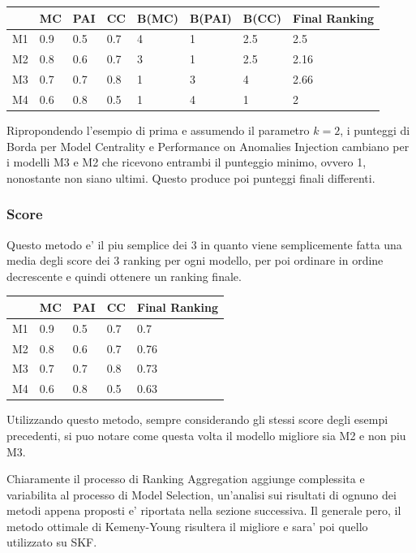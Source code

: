 \begin{tabular}{|l|l|l|l|l|l|l|l|}
\hline
   & MC  & PAI & CC  & B(MC) & B(PAI) & B(CC) & Final Ranking \\ \hline
M1 & 0.9 & 0.5 & 0.7 & 4     & 1      & 2.5   & 2.5           \\ \hline
M2 & 0.8 & 0.6 & 0.7 & 3     & 1      & 2.5   & 2.16          \\ \hline
M3 & 0.7 & 0.7 & 0.8 & 1     & 3      & 4     & 2.66          \\ \hline
M4 & 0.6 & 0.8 & 0.5 & 1     & 4      & 1     & 2             \\ \hline
\end{tabular}


Ripropondendo l'esempio di prima e assumendo il parametro \(k=2\), i punteggi di Borda per Model Centrality e Performance on Anomalies Injection cambiano per i modelli M3 e M2 che ricevono entrambi il punteggio minimo, ovvero 1, nonostante non siano ultimi. Questo produce poi punteggi finali differenti.
\subsubsection{Score}
Questo metodo e' il piu semplice dei 3 in quanto viene semplicemente fatta una media degli score dei 3 ranking per ogni modello, per poi ordinare in ordine decrescente e quindi ottenere un ranking finale.


\begin{tabular}{|l|l|l|l|l|}
\hline
   & MC  & PAI & CC  & Final Ranking \\ \hline
M1 & 0.9 & 0.5 & 0.7 & 0.7           \\ \hline
M2 & 0.8 & 0.6 & 0.7 & 0.76          \\ \hline
M3 & 0.7 & 0.7 & 0.8 & 0.73          \\ \hline
M4 & 0.6 & 0.8 & 0.5 & 0.63          \\ \hline
\end{tabular}


Utilizzando questo metodo, sempre considerando gli stessi score degli esempi precedenti, si puo notare come questa volta il modello migliore sia M2 e non piu M3.

Chiaramente il processo di Ranking Aggregation aggiunge complessita e variabilita al processo di Model Selection, un'analisi sui risultati di ognuno dei metodi appena proposti e' riportata nella sezione successiva. Il generale pero, il metodo ottimale di Kemeny-Young risultera il migliore e sara' poi quello utilizzato su SKF.

